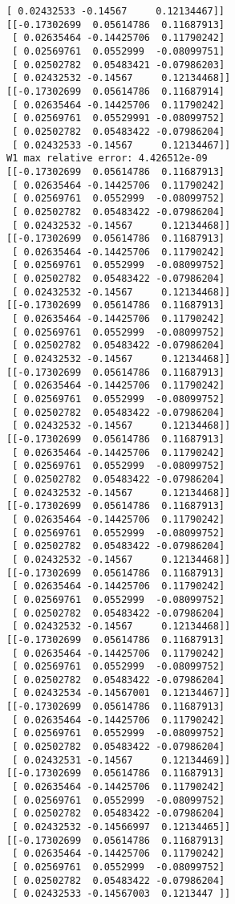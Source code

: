 \documentclass[11pt]{article}
\begin{document}
\begin{Verbatim}[commandchars=\\\{\}]
 [ 0.02432533 -0.14567     0.12134467]]
[[-0.17302699  0.05614786  0.11687913]
 [ 0.02635464 -0.14425706  0.11790242]
 [ 0.02569761  0.0552999  -0.08099751]
 [ 0.02502782  0.05483421 -0.07986203]
 [ 0.02432532 -0.14567     0.12134468]]
[[-0.17302699  0.05614786  0.11687914]
 [ 0.02635464 -0.14425706  0.11790242]
 [ 0.02569761  0.05529991 -0.08099752]
 [ 0.02502782  0.05483422 -0.07986204]
 [ 0.02432533 -0.14567     0.12134467]]
W1 max relative error: 4.426512e-09
[[-0.17302699  0.05614786  0.11687913]
 [ 0.02635464 -0.14425706  0.11790242]
 [ 0.02569761  0.0552999  -0.08099752]
 [ 0.02502782  0.05483422 -0.07986204]
 [ 0.02432532 -0.14567     0.12134468]]
[[-0.17302699  0.05614786  0.11687913]
 [ 0.02635464 -0.14425706  0.11790242]
 [ 0.02569761  0.0552999  -0.08099752]
 [ 0.02502782  0.05483422 -0.07986204]
 [ 0.02432532 -0.14567     0.12134468]]
[[-0.17302699  0.05614786  0.11687913]
 [ 0.02635464 -0.14425706  0.11790242]
 [ 0.02569761  0.0552999  -0.08099752]
 [ 0.02502782  0.05483422 -0.07986204]
 [ 0.02432532 -0.14567     0.12134468]]
[[-0.17302699  0.05614786  0.11687913]
 [ 0.02635464 -0.14425706  0.11790242]
 [ 0.02569761  0.0552999  -0.08099752]
 [ 0.02502782  0.05483422 -0.07986204]
 [ 0.02432532 -0.14567     0.12134468]]
[[-0.17302699  0.05614786  0.11687913]
 [ 0.02635464 -0.14425706  0.11790242]
 [ 0.02569761  0.0552999  -0.08099752]
 [ 0.02502782  0.05483422 -0.07986204]
 [ 0.02432532 -0.14567     0.12134468]]
[[-0.17302699  0.05614786  0.11687913]
 [ 0.02635464 -0.14425706  0.11790242]
 [ 0.02569761  0.0552999  -0.08099752]
 [ 0.02502782  0.05483422 -0.07986204]
 [ 0.02432532 -0.14567     0.12134468]]
[[-0.17302699  0.05614786  0.11687913]
 [ 0.02635464 -0.14425706  0.11790242]
 [ 0.02569761  0.0552999  -0.08099752]
 [ 0.02502782  0.05483422 -0.07986204]
 [ 0.02432532 -0.14567     0.12134468]]
[[-0.17302699  0.05614786  0.11687913]
 [ 0.02635464 -0.14425706  0.11790242]
 [ 0.02569761  0.0552999  -0.08099752]
 [ 0.02502782  0.05483422 -0.07986204]
 [ 0.02432534 -0.14567001  0.12134467]]
[[-0.17302699  0.05614786  0.11687913]
 [ 0.02635464 -0.14425706  0.11790242]
 [ 0.02569761  0.0552999  -0.08099752]
 [ 0.02502782  0.05483422 -0.07986204]
 [ 0.02432531 -0.14567     0.12134469]]
[[-0.17302699  0.05614786  0.11687913]
 [ 0.02635464 -0.14425706  0.11790242]
 [ 0.02569761  0.0552999  -0.08099752]
 [ 0.02502782  0.05483422 -0.07986204]
 [ 0.02432532 -0.14566997  0.12134465]]
[[-0.17302699  0.05614786  0.11687913]
 [ 0.02635464 -0.14425706  0.11790242]
 [ 0.02569761  0.0552999  -0.08099752]
 [ 0.02502782  0.05483422 -0.07986204]
 [ 0.02432533 -0.14567003  0.1213447 ]]

\end{Verbatim}
\end{document}
